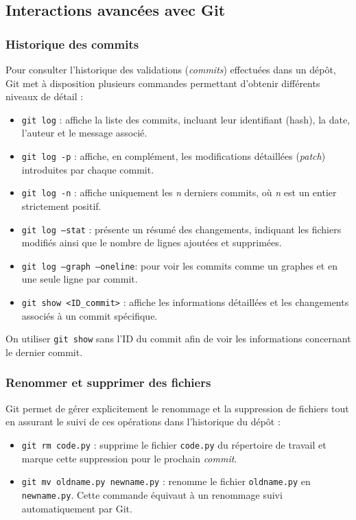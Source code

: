 \documentclass{article}
\begin{document}
\subsection{Interactions avancées avec Git}

\subsubsection{Historique des commits}

Pour consulter l’historique des validations (\emph{commits}) effectuées dans un dépôt, Git met à disposition plusieurs commandes permettant d’obtenir différents niveaux de détail :
\begin{itemize}
    \item \texttt{git log} : affiche la liste des commits, incluant leur identifiant (hash), la date, l’auteur et le message associé.
    \item \texttt{git log -p} : affiche, en complément, les modifications détaillées (\emph{patch}) introduites par chaque commit.
    \item \texttt{git log -n} : affiche uniquement les \emph{n} derniers commits, où \emph{n} est un entier strictement positif.
    \item \texttt{git log --stat} : présente un résumé des changements, indiquant les fichiers modifiés ainsi que le nombre de lignes ajoutées et supprimées.
    \item \texttt{git log --graph --oneline}: pour voir les commits comme un graphes et en une seule ligne par commit.
    \item \texttt{git show \textless{}ID\_commit\textgreater{}} : affiche les informations détaillées et les changements associés à un commit spécifique.
\end{itemize}
On utiliser \texttt{git show} sans l'ID du commit afin de voir les informations concernant le dernier commit.
\subsubsection{Renommer et supprimer des fichiers}

Git permet de gérer explicitement le renommage et la suppression de fichiers tout en assurant le suivi de ces opérations dans l’historique du dépôt :
\begin{itemize}
    \item \texttt{git rm code.py} : supprime le fichier \texttt{code.py} du répertoire de travail et marque cette suppression pour le prochain \emph{commit}.
    \item \texttt{git mv oldname.py newname.py} : renomme le fichier \texttt{oldname.py} en \texttt{newname.py}. Cette commande équivaut à un renommage suivi automatiquement par Git.
\end{itemize}
\end{document}
